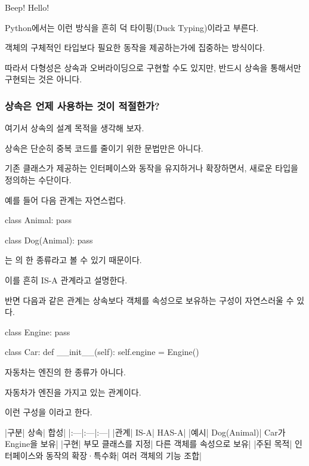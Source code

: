 \begin{dhkzsh}
Beep!
Hello!
\end{dhkzsh}

Python에서는 이런 방식을 흔히 덕 타이핑(Duck Typing)이라고 부른다.

객체의 구체적인 타입보다 필요한 동작을 제공하는가에 집중하는 방식이다.

따라서 다형성은 상속과 오버라이딩으로 구현할 수도 있지만, 반드시 상속을 통해서만 구현되는 것은 아니다.

\subsubsection{상속은 언제 사용하는 것이 적절한가?}

여기서 상속의 설계 목적을 생각해 보자.

상속은 단순히 중복 코드를 줄이기 위한 문법만은 아니다.

기존 클래스가 제공하는 인터페이스와 동작을 유지하거나 확장하면서, 새로운 타입을 정의하는 수단이다.

예를 들어 다음 관계는 자연스럽다.

\begin{dhkcode}
class Animal:
    pass


class Dog(Animal):
    pass
\end{dhkcode}

는 의 한 종류라고 볼 수 있기 때문이다.

이를 흔히 IS-A 관계라고 설명한다.

반면 다음과 같은 관계는 상속보다 객체를 속성으로 보유하는 구성이 자연스러울 수 있다.

\begin{dhkcode}
class Engine:
    pass


class Car:
    def __init__(self):
        self.engine = Engine()
\end{dhkcode}

자동차는 엔진의 한 종류가 아니다.

자동차가 엔진을 가지고 있는 관계이다.

이런 구성을 이라고 한다.

\begin{dhktable}
|구분|	상속|	합성|
|:---|:---|:---|
|관계|	IS-A|	HAS-A|
|예시|	Dog(Animal)|	Car가 Engine을 보유|
|구현|	부모 클래스를 지정|	다른 객체를 속성으로 보유|
|주된 목적|	인터페이스와 동작의 확장·특수화|	여러 객체의 기능 조합|
\end{dhktable}

